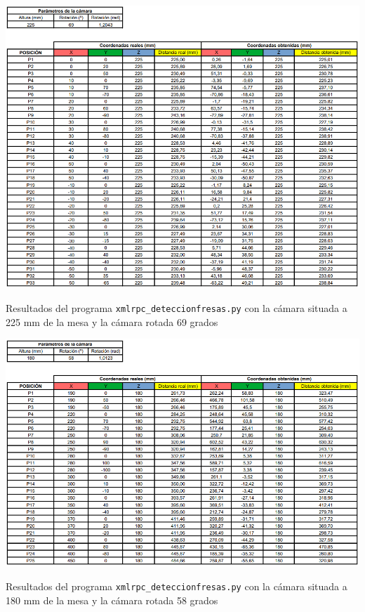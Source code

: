   \begin{table}[H]
     \centering
     \begin{center}
       \includegraphics[width=155mm]{figs/Resultados 225 mm 69 grados.png}
     \end{center}
     \caption{Resultados del programa \texttt{xmlrpc\_deteccionfresas.py} con la cámara situada a 225 mm de la mesa y la cámara rotada 69 grados}
     \label{tab:resultados_225mm_69grados}
  \end{table}  
  
  \begin{table}[H]
     \centering
     \begin{center}
       \includegraphics[width=155mm]{figs/Resultados 180 mm 58 grados.png}
     \end{center}
     \caption{Resultados del programa \texttt{xmlrpc\_deteccionfresas.py} con la cámara situada a 180 mm de la mesa y la cámara rotada 58 grados}
     \label{tab:resultados_180mm_58grados}
  \end{table}

